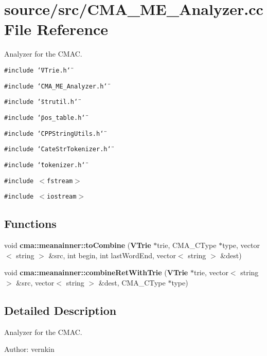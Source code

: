 \section{source/src/CMA\_\-ME\_\-Analyzer.cc File Reference}
\label{CMA__ME__Analyzer_8cc}
Analyzer for the CMAC.  


{\tt \#include \char`\"{}VTrie.h\char`\"{}}\par
{\tt \#include \char`\"{}CMA\_\-ME\_\-Analyzer.h\char`\"{}}\par
{\tt \#include \char`\"{}strutil.h\char`\"{}}\par
{\tt \#include \char`\"{}pos\_\-table.h\char`\"{}}\par
{\tt \#include \char`\"{}CPPStringUtils.h\char`\"{}}\par
{\tt \#include \char`\"{}CateStrTokenizer.h\char`\"{}}\par
{\tt \#include \char`\"{}tokenizer.h\char`\"{}}\par
{\tt \#include $<$fstream$>$}\par
{\tt \#include $<$iostream$>$}\par
\subsection*{Functions}
\begin{CompactItemize}
\item 
void {\bf cma::meanainner::toCombine} ({\bf VTrie} $\ast$trie, CMA\_\-CType $\ast$type, vector$<$ string $>$ \&src, int begin, int lastWordEnd, vector$<$ string $>$ \&dest)
\item 
void \textbf{cma::meanainner::combineRetWithTrie} ({\bf VTrie} $\ast$trie, vector$<$ string $>$ \&src, vector$<$ string $>$ \&dest, CMA\_\-CType $\ast$type)\label{namespacecma_1_1meanainner_aba0478eb017501ee85814fcbc0486fa}

\end{CompactItemize}


\subsection{Detailed Description}
Analyzer for the CMAC. 

\begin{Desc}
\item[Author:]vernkin \end{Desc}
